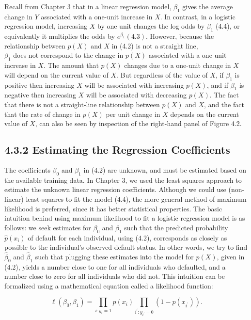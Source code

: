 \documentclass[10pt]{article}
\begin{document}
Recall from Chapter 3 that in a linear regression model, $\beta_{1}$ gives the average change in $Y$ associated with a one-unit increase in $X$. In contrast, in a logistic regression model, increasing $X$ by one unit changes the log odds by $\beta_{1}$ (4.4), or equivalently it multiplies the odds by $e^{\beta_{1}}(4.3)$. However, because the relationship between $p(X)$ and $X$ in (4.2) is not a straight line,\\
$\beta_{1}$ does not correspond to the change in $p(X)$ associated with a one-unit increase in $X$. The amount that $p(X)$ changes due to a one-unit change in $X$ will depend on the current value of $X$. But regardless of the value of $X$, if $\beta_{1}$ is positive then increasing $X$ will be associated with increasing $p(X)$, and if $\beta_{1}$ is negative then increasing $X$ will be associated with decreasing $p(X)$. The fact that there is not a straight-line relationship between $p(X)$ and $X$, and the fact that the rate of change in $p(X)$ per unit change in $X$ depends on the current value of $X$, can also be seen by inspection of the right-hand panel of Figure 4.2.

\subsection*{4.3.2 Estimating the Regression Coefficients}
The coefficients $\beta_{0}$ and $\beta_{1}$ in (4.2) are unknown, and must be estimated based on the available training data. In Chapter 3, we used the least squares approach to estimate the unknown linear regression coefficients. Although we could use (non-linear) least squares to fit the model (4.4), the more general method of maximum likelihood is preferred, since it has better statistical properties. The basic intuition behind using maximum likelihood to fit a logistic regression model is as follows: we seek estimates for $\beta_{0}$ and $\beta_{1}$ such that the predicted probability $\hat{p}\left(x_{i}\right)$ of default for each individual, using (4.2), corresponds as closely as possible to the individual's observed default status. In other words, we try to find $\hat{\beta}_{0}$ and $\hat{\beta}_{1}$ such that plugging these estimates into the model for $p(X)$, given in (4.2), yields a number close to one for all individuals who defaulted, and a number close to zero for all individuals who did not. This intuition can be formalized using a mathematical equation called a likelihood function:


\begin{equation*}
\ell\left(\beta_{0}, \beta_{1}\right)=\prod_{i: y_{i}=1} p\left(x_{i}\right) \prod_{i^{\prime}: y_{i^{\prime}}=0}\left(1-p\left(x_{i^{\prime}}\right)\right) . \tag{4.5}
\end{equation*}
\end{document}
